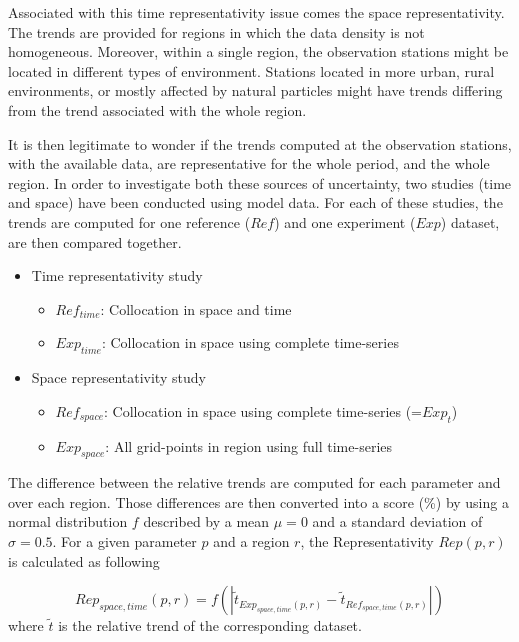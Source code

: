 \documentclass[journal abbreviation, manuscript]{copernicus}
\begin{document}
Associated with this time representativity issue comes the space representativity. The trends are provided for regions in which the data density is not homogeneous. Moreover, within a single region, the observation stations might be located in different types of environment. Stations located in more urban, rural environments, or mostly affected by natural particles might have trends differing from the trend associated with the whole region.

It is then legitimate to wonder if the trends computed at the observation stations, with the available data, are representative for the whole period, and the whole region. In order to investigate both these sources of uncertainty, two studies (time and space) have been conducted using model data. For each of these studies, the trends are computed for one reference ($Ref$) and one experiment ($Exp$) dataset, are then compared together.
\begin{itemize}
 \item Time representativity study
       \begin{itemize}
        \item $Ref_{time}$: Collocation in space and time
        \item $Exp_{time}$: Collocation in space using complete time-series
       \end{itemize}
 \item Space representativity study
       \begin{itemize}
        \item $Ref_{space}$: Collocation in space using complete time-series (=$Exp_{t}$)
        \item $Exp_{space}$: All grid-points in region using full time-series
       \end{itemize}
\end{itemize}

The difference between the relative trends are computed for each parameter and over each region. Those differences are then converted into a score (\unit{\%}) by using a normal distribution $f$ described by a mean $\mu=0$ and a standard deviation of $\sigma=0.5$. For a given parameter $p$ and a region $r$, the Representativity $Rep(p,r)$ is calculated as following

\begin{equation}
 Rep_{space,time}(p, r) = {f\left(\left| \tilde{t}_{Exp_{space,time}(p, r)}-\tilde{t}_{Ref_{space,time}(p, r)} \right|\right)}
\end{equation}
where $\tilde{t}$ is the relative trend of the corresponding dataset.
\end{document}
